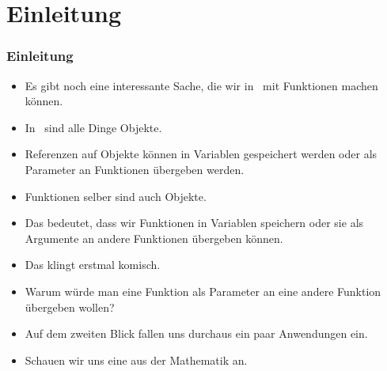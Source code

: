 \documentclass[aspectratio=169,mathserif,notheorems]{beamer}%
\subtitle{30.~Funktionen als Parameter, \mbox{\texttt{Callable}s und \texttt{lambda}s}}%
\begin{document}
%
%
\startPresentation%
%
\section{Einleitung}%
\begin{frame}[t]%
\frametitle{Einleitung}%
\begin{itemize}%
%
%
%
%
%
%
%
%
\item<5-> Es gibt noch eine interessante Sache, die wir in \python\ mit Funktionen machen können.%
%
\item<6-> In \python\ sind alle Dinge Objekte.%
%
\item<7-> Referenzen auf Objekte können in Variablen gespeichert werden oder als Parameter an Funktionen übergeben werden.%
%
\item<8-> Funktionen selber sind auch Objekte.%
%
\item<9-> Das bedeutet, dass wir Funktionen in Variablen speichern oder sie als Argumente an andere Funktionen übergeben können.%
%
\item<10-> Das klingt erstmal komisch.%
%
\item<11-> Warum würde man eine Funktion als Parameter an eine andere Funktion übergeben wollen?%
%
\item<12-> Auf dem zweiten Blick fallen uns durchaus ein paar Anwendungen ein.%
%
\item<13-> Schauen wir uns eine aus der Mathematik an.%
\end{itemize}%
\end{frame}%
%
\end{document}
